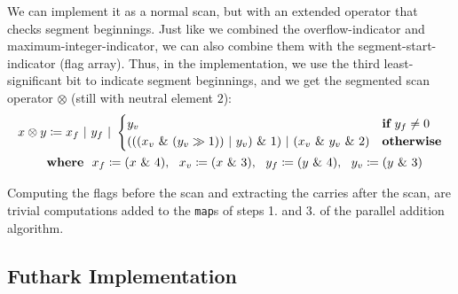 We can implement it as a normal scan, but with an extended operator that checks
segment beginnings. Just like we combined the overflow-indicator and
maximum-integer-indicator, we can also combine them with the
segment-start-indicator (flag array). Thus, in the implementation, we use the
third least-significant bit to indicate segment beginnings, and we get the
segmented scan operator $\otimes$ (still with neutral element $2$):
\begin{align}
  \label{eq:segscanop}
  x \otimes y &\coloneq x_f~|~y_f~|~\begin{cases} y_v & \textbf{if}~y_f \neq 0 \\ (((x_v~\&~(y_v \gg 1))~|~y_v)~\&~1)~|~(x_v~\&~y_v~\&~2) & \textbf{otherwise}\end{cases}\\
  & \textbf{where}~~x_f\coloneq (x~\&~4),~~x_v\coloneq (x~\&~3),~~y_f\coloneq (y~\&~4),~~y_v\coloneq (y~\&~3)\notag
\end{align}

Computing the flags before the scan and extracting the carries after the scan,
are trivial computations added to the \texttt{map}s of steps 1. and 3. of the
parallel addition algorithm.

\subsection{Futhark Implementation}
\label{subsec:addfut}

